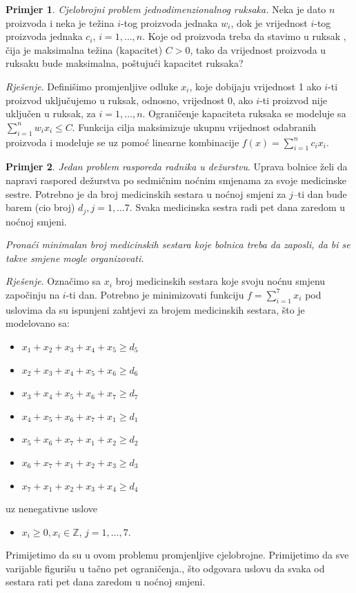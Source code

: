 \documentclass[a4paper, utf8, 11pt, colorlinks]{book}
\theoremstyle{definition}
\newtheorem{primjer}{Primjer}[chapter]
\begin{document}
\begin{primjer}
\emph{Cjelobrojni problem jednodimenzionalnog ruksaka.} Neka je dato $n$ proizvoda i neka je težina $i$-tog proizvoda jednaka $w_i$, dok je vrijednost $i$-tog proizvoda jednaka $c_i$, $i=1,\ldots,n$. Koje od proizvoda treba da stavimo u ruksak , čija je maksimalna težina (kapacitet) $C>0$, tako da   vrijednost proizvoda u ruksaku bude maksimalna, poštujući  kapacitet  ruksaka? 

\emph{Rješenje}. Definišimo promjenljive odluke $x_i$, koje dobijaju vrijednost 1 ako  $i$-ti proizvod uključujemo u ruksak, odnosno, vrijednost 0, ako $i$-ti proizvod nije uključen u ruksak, za $i=1,\ldots,n$. Ograničenje kapaciteta ruksaka se modeluje sa $\sum_{i=1}^n w_i x_i \leq C$. Funkcija cilja maksimizuje ukupnu vrijednost odabranih proizvoda i modeluje se uz pomoć linearne kombinacije $f(x) = \sum_{i=1}^n c_i x_i$. 
\end{primjer}
\begin{primjer}
\emph{Jedan problem rasporeda radnika u dežurstvu}. Uprava bolnice želi da napravi raspored dežurstva po sedmičnim noćnim smjenama za svoje medicinske sestre.  Potrebno je da broj medicinskih sestara u noćnoj smjeni za $j$--ti dan bude barem (cio broj) $d_j, j = 1,\ldots 7$. Svaka
medicinska sestra radi pet dana zaredom u noćnoj smjeni. 

\emph{Pronaći minimalan broj medicinskih sestara koje bolnica treba da zaposli, da bi se takve smjene mogle organizovati.}

\emph{Rješenje}. Označimo sa $x_i$ broj medicinskih sestara koje svoju noćnu smjenu započinju na $i$-ti dan. Potrebno je minimizovati funkciju 
$f = \sum_{i=1}^7 x_i$ pod uslovima da su ispunjeni zahtjevi za brojem medicinskih sestara, što je modelovano sa:
\begin{itemize}
	\item $x_1 + x_2 + x_3 + x_4 + x_5 \geq d_5 $
	\item $x_2 + x_3 + x_4 + x_5 + x_6 \geq d_6$
	\item $x_3 + x_4 + x_5 + x_6 + x_7 \geq d_7$
	\item $x_4 + x_5 + x_6 + x_7 + x_1 \geq d_1 $
	\item $x_5 + x_6 + x_7 + x_1 + x_2   \geq d_2$
	\item $x_6 + x_7 + x_1 + x_2 + x_3  \geq d_3$
	\item $  x_7 + x_1 + x_2 + x_3 + x_4 \geq d_4$
\end{itemize}
uz nenegativne uslove 
\begin{itemize}
	\item $x_i \geq 0, x_i \in \mathbb{Z}$, $j=1,\ldots,7.$
\end{itemize}
Primijetimo da su u ovom problemu promjenljive  cjelobrojne. Primijetimo da sve varijable figurišu u tačno pet ograničenja., što odgovara uslovu da svaka od sestara rati pet dana zaredom u noćnoj smjeni.
\end{primjer}
\end{document}

